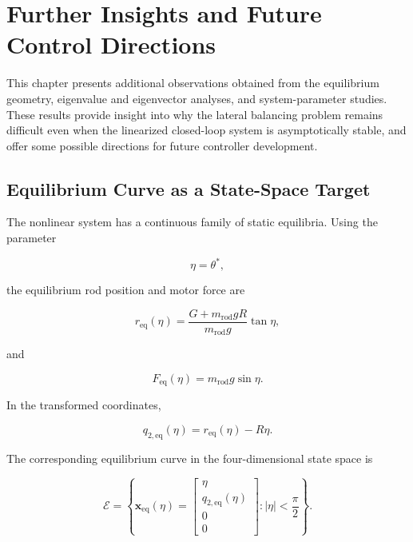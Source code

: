\chapter{Further Insights and Future Control Directions}
\label{chap:further-insights}

This chapter presents additional observations obtained from the equilibrium geometry, eigenvalue and eigenvector analyses, and system-parameter studies. These results provide insight into why the lateral balancing problem remains difficult even when the linearized closed-loop system is asymptotically stable, and offer some possible directions for future controller development.

\section{Equilibrium Curve as a State-Space Target}
\label{sec:equilibrium-state-space-target}

The nonlinear system has a continuous family of static equilibria. Using the parameter

\begin{equation}
\eta=\theta^{*},
\end{equation}

the equilibrium rod position and motor force are

\begin{equation}
r_{\mathrm{eq}}(\eta)
=
\frac{G+m_{\mathrm{rod}}gR}
     {m_{\mathrm{rod}}g}
\tan\eta,
\label{eq:parameterized-equilibrium-position}
\end{equation}

and

\begin{equation}
F_{\mathrm{eq}}(\eta)
=
m_{\mathrm{rod}}g\sin\eta.
\label{eq:parameterized-equilibrium-force}
\end{equation}

In the transformed coordinates,

\begin{equation}
q_{2,\mathrm{eq}}(\eta)
=
r_{\mathrm{eq}}(\eta)-R\eta.
\end{equation}

The corresponding equilibrium curve in the four-dimensional state space is

\begin{equation}
\mathcal{E}
=
\left\{
\mathbf{x}_{\mathrm{eq}}(\eta)
=
\begin{bmatrix}
\eta \\
q_{2,\mathrm{eq}}(\eta) \\
0 \\
0
\end{bmatrix}
:
|\eta|<\frac{\pi}{2}
\right\}.
\label{eq:state-space-equilibrium-curve}
\end{equation}

